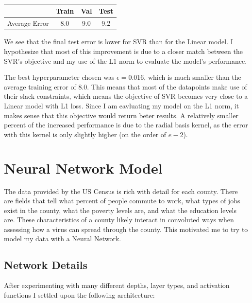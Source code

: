 \documentclass[12pt]{article}
\begin{document}
    \begin{center}
    \begin{tabular}{|c|c|c|c|}

        \hline

        & Train & Val & Test \\ \hline
        Average Error & 8.0 & 9.0 & 9.2 \\ \hline

    \end{tabular}
    \end{center}

    We see that the final test error is lower for SVR than for the Linear model. I hypothesize that most of this improvement is due to a closer match between the SVR's objective and my use of the L1 norm to evaluate the model's performance.

    The best hyperparameter chosen was $\epsilon = 0.016$, which is much smaller than the average training error of $8.0$. This means that most of the datapoints make use of their slack constraints, which means the objective of SVR becomes very close to a Linear model with L1 loss. Since I am eavluating my model on the L1 norm, it makes sense that this objective would return beter results. A relatively smaller percent of the increased performance is due to the radial basis kernel, as the error with this kernel is only slightly higher (on the order of $e-2$).

\section{Neural Network Model}

    The data provided by the US Census is rich with detail for each county. There are fields that tell what percent of people commute to work, what types of jobs exist in the county, what the poverty levels are, and what the education levels are. These characteristics of a county likely interact in convoluted ways when assessing how a virus can spread through the county. This motivated me to try to model my data with a Neural Network.

    \subsection{Network Details}

        After experimenting with many different depths, layer types, and activation functions I settled upon the following architecture:
\end{document}
